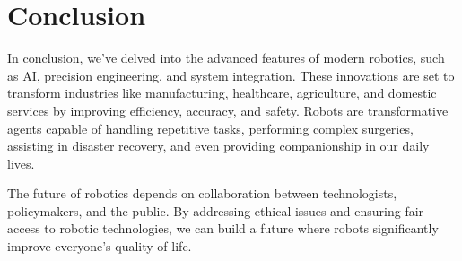 \documentclass[12pt, a4paper]{article}
\begin{document}
\section{Conclusion}
In conclusion, we've delved into the advanced features of modern robotics, such as AI, precision engineering, and system integration. These innovations are set to transform industries like manufacturing, healthcare, agriculture, and domestic services by improving efficiency, accuracy, and safety. Robots are transformative agents capable of handling repetitive tasks, performing complex surgeries, assisting in disaster recovery, and even providing companionship in our daily lives.

The future of robotics depends on collaboration between technologists, policymakers, and the public. By addressing ethical issues and ensuring fair access to robotic technologies, we can build a future where robots significantly improve everyone's quality of life.
\end{document}
